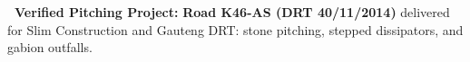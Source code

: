 \vfill

\noindent
\begin{tcolorbox}[enhanced, colback=white, colframe=mhnavy, boxrule=0.8pt, arc=3pt, left=8pt, right=8pt, top=6pt, bottom=6pt, drop shadow=black!3]
    {\fontsize{8pt}{10.6pt}\selectfont\color{mhnavy}\bfseries\faCheckCircle\ Verified Pitching Project:}\quad
    {\fontsize{8pt}{10.6pt}\selectfont\color{mhtext}
    \textbf{Road K46-AS (DRT 40/11/2014)} delivered for Slim Construction and Gauteng DRT: stone pitching, stepped dissipators, and gabion outfalls.
    }
\end{tcolorbox}

\clearpage

